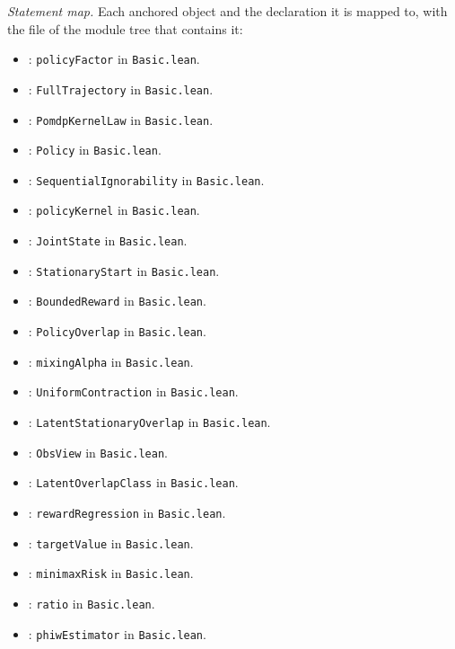 \documentclass[11pt]{article}
\begin{document}
\emph{Statement map.} Each anchored object and the declaration it is mapped to, with the file of the module tree that contains it:
\begin{itemize}
\setlength{\itemsep}{0pt}
\item {}: \texttt{policyFactor} in \texttt{Basic.lean}.
\item {}: \texttt{FullTrajectory} in \texttt{Basic.lean}.
\item {}: \texttt{PomdpKernelLaw} in \texttt{Basic.lean}.
\item {}: \texttt{Policy} in \texttt{Basic.lean}.
\item {}: \texttt{SequentialIgnorability} in \texttt{Basic.lean}.
\item {}: \texttt{policyKernel} in \texttt{Basic.lean}.
\item {}: \texttt{JointState} in \texttt{Basic.lean}.
\item {}: \texttt{StationaryStart} in \texttt{Basic.lean}.
\item {}: \texttt{BoundedReward} in \texttt{Basic.lean}.
\item {}: \texttt{PolicyOverlap} in \texttt{Basic.lean}.
\item {}: \texttt{mixingAlpha} in \texttt{Basic.lean}.
\item {}: \texttt{UniformContraction} in \texttt{Basic.lean}.
\item {}: \texttt{LatentStationaryOverlap} in \texttt{Basic.lean}.
\item {}: \texttt{ObsView} in \texttt{Basic.lean}.
\item {}: \texttt{LatentOverlapClass} in \texttt{Basic.lean}.
\item {}: \texttt{rewardRegression} in \texttt{Basic.lean}.
\item {}: \texttt{targetValue} in \texttt{Basic.lean}.
\item {}: \texttt{minimaxRisk} in \texttt{Basic.lean}.
\item {}: \texttt{ratio} in \texttt{Basic.lean}.
\item {}: \texttt{phiwEstimator} in \texttt{Basic.lean}.

\end{itemize}
\end{document}
